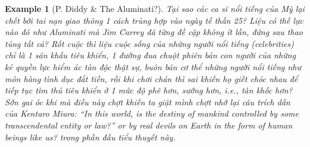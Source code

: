 \documentclass[12pt,twoside]{book}
\newtheorem{example}{Example}
\begin{document}
\begin{example}[P. Diddy \& The Aluminati?]
	Tại sao các ca sĩ nổi tiếng của Mỹ lại chết bởi tai nạn giao thông 1 cách trùng hợp vào ngày tế thần 25? Liệu có thế lực nào đó như Aluminati mà {\sc Jim Carrey} đã từng đề cập không ít lần, đứng sau thao túng tất cả? Rốt cuộc thì liệu cuộc sống của những người nổi tiếng (celebrities) chỉ là 1 sân khấu tiêu khiển, 1 đường đua chuột phiên bản con người của những kẻ quyền lực hiểm ác tàn độc thật sự, buôn bán cơ thể những người nổi tiếng như món hàng tình dục đắt tiền, rồi khi chơi chán thì sai khiến họ giết chóc nhau để tiếp tục tìm thú tiêu khiển ở 1 mức độ phê hơn, sướng hơn, i.e., tàn khốc hơn? Sởn gai óc khi mà điều này chợt khiến ta giật mình chợt nhớ lại câu trích dẫn của {\sc Kentaro Miura}: ``In this world, is the destiny of mankind controlled by some transcendental entity or law?'' or by real devils on Earth in the form of human beings like us? trong phần đầu tiểu thuyết này.
\end{example}
\end{document}
